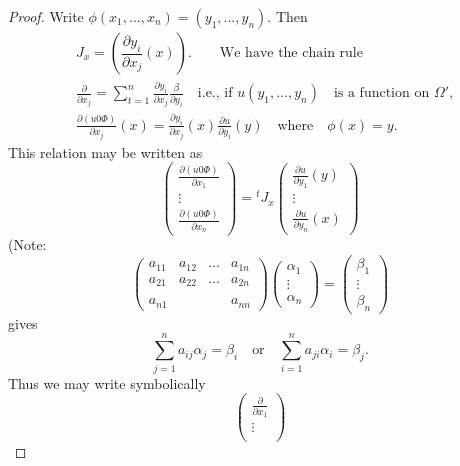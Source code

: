 \begin{proof}
Write $\phi(x_{1},\ldots,x_{n})=(y_{1},\ldots,y_{n})$. Then
\begin{align*}
& J_{x}=\left(\dfrac{\partial y_{i}}{\partial x_{j}}(x)\right).\qquad\text{We have the chain rule}\\[3pt]
& \frac{\partial}{\partial x_{j}}=\sum\limits^{n}_{t=1}\frac{\partial y_{i}}{\partial x_{j}}\frac{\beta}{\partial y_{i}}\quad\text{i.e., \ if } u(y_{1},\ldots,y_{n})\quad \text{is a function on } \Omega',\\[3pt]
& \frac{\partial (u0\Phi)}{\partial x_{j}}(x)=\frac{\partial y_{i}}{\partial x_{j}}(x)\frac{\partial u}{\partial y_{i}}(y)\quad\text{where}\quad \phi(x)=y.
\end{align*}
This relation may be written as
$$
\begin{pmatrix}
\frac{\partial (u 0\Phi)}{\partial x_{1}}\\[3pt]
\vdots\\[3pt]
\frac{\partial(u 0 \Phi)}{\partial x_{n}}
\end{pmatrix}
=
{}^{t}J_{x}
\begin{pmatrix}
\frac{\partial u}{\partial y_{1}}(y)\\[3pt]
\vdots\\[3pt]
\frac{\partial u}{\partial y_{n}}(x)
\end{pmatrix}
$$
(Note:\pageoriginale
$$
\begin{pmatrix}
a_{11} & a_{12} & \ldots & a_{1n}\\[3pt]
a_{21} & a_{22} & \ldots & a_{2n}\\[3pt]
         &         &      &\\
a_{n1} & & & a_{nn}
\end{pmatrix}
\begin{pmatrix}
\alpha_{1}\\[3pt]
\vdots\\[3pt]
\alpha_{n}
\end{pmatrix}
=
\begin{pmatrix}
\beta_{1}\\[3pt]
\vdots\\[3pt]
\beta_{n}
\end{pmatrix}
$$
gives
$$
\sum^{n}_{j=1}a_{ij}\alpha_{j}=\beta_{i}\quad\text{or}\quad \sum^{n}_{i=1}a_{ji}\alpha_{i}=\beta_{j}.
$$
Thus we may write symbolically
$$
\begin{pmatrix}
\frac{\partial}{\partial x_{1}}\\[3pt]
\vdots\\[3pt]

\end{pmatrix}$$
\end{proof}
